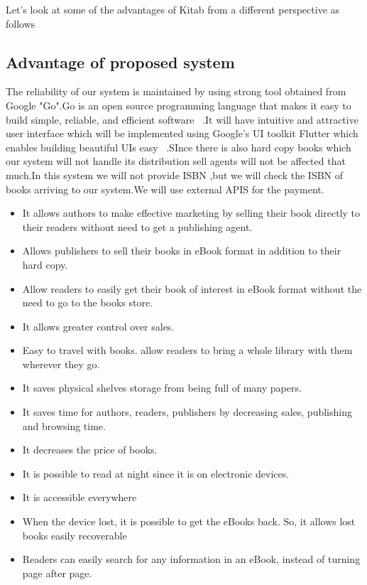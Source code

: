 Let’s look at some of the advantages of Kitab from a different perspective as follows


\subsection{Advantage of proposed system}
		The reliability of our system is maintained by using strong tool obtained from Google "Go".Go is an open source programming language that makes it easy to build simple, reliable, and efficient software ~\cite{webgolang}.It will have intuitive and attractive user interface which will be implemented using  Google’s UI toolkit Flutter which enables building beautiful UIs easy ~\cite{webflut}.SInce there is also hard copy books which our system will not handle its distribution sell agents will not be affected that much.In this system we will not provide ISBN ,but we will  check the ISBN of books arriving to our system.We will use external APIS for the payment.

\begin{itemize}
	\item It allows authors to make effective marketing by selling their book directly to their readers without need to get a publishing agent.
	\item Allows publishers to sell their books in eBook format in addition to their hard copy.
	\item Allow readers to easily get their book of interest in eBook format without the need to go to the books store.
	\item It allows greater control over sales.
	\item Easy to travel with books. allow readers to bring a whole library with them wherever they go.
	\item It saves physical shelves storage from being full of many papers.
	\item It saves time for authors, readers, publishers by decreasing sales, publishing and browsing time.
	\item It decreases the price of books.
	\item It is possible to read at night since it is on electronic devices.
	\item It is accessible everywhere 
	\item When the device lost, it is possible to get the eBooks back. So, it allows lost books easily recoverable
	\item Readers can easily search for any information in an eBook, instead of turning page after page.
\end{itemize}

